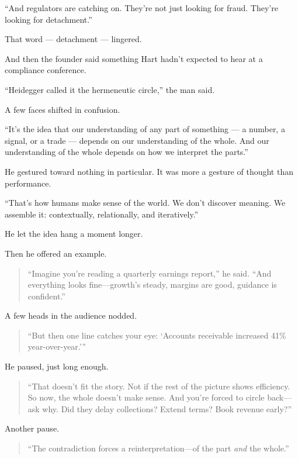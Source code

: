 ``And regulators are catching on.
They’re not just looking for fraud.
They’re looking for detachment.''

That word --- detachment --- lingered.

And then the founder said something Hart hadn’t expected to hear at a compliance conference.

``Heidegger called it the hermeneutic circle,'' the man said.

A few faces shifted in confusion.

``It’s the idea that our understanding of any part of something 
--- a number, a signal, or a trade --- 
depends on our understanding of the whole. 
And our understanding of the whole depends on how we interpret the parts.''

He gestured toward nothing in particular. It was more a gesture of thought than performance.

``That’s how humans make sense of the world.
We don’t discover meaning. We assemble it: contextually, relationally, and iteratively.''




He let the idea hang a moment longer.

Then he offered an example.

\begin{quote}
``Imagine you’re reading a quarterly earnings report,'' he said.  
``And everything looks fine—growth’s steady, margins are good, guidance is confident.''
\end{quote}

A few heads in the audience nodded.

\begin{quote}
``But then one line catches your eye:  
‘Accounts receivable increased 41\% year-over-year.’''
\end{quote}

He paused, just long enough.

\begin{quote}
``That doesn’t fit the story. Not if the rest of the picture shows efficiency.  
So now, the whole doesn’t make sense.  
And you're forced to circle back—ask why.  
Did they delay collections? Extend terms? Book revenue early?''
\end{quote}

Another pause.

\begin{quote}
``The contradiction forces a reinterpretation—of the part \textit{and} the whole.''
\end{quote}

